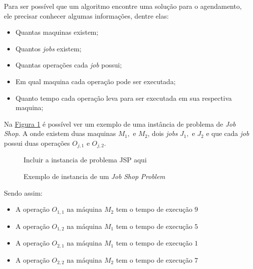             Para ser possível que um algoritmo encontre uma solução para o agendamento, ele precisar conhecer algumas informações, dentre elas: 
            \begin{itemize}
                \item Quantas maquinas existem;
                \item Quantos \textit{jobs} existem;
                \item Quantas operações cada \textit{job} possui;
                \item Em qual maquina cada operação pode ser executada;
                \item Quanto tempo cada operação leva para ser executada em sua respectiva maquina;
            \end{itemize}


            Na 
            \hyperref[fig:ex-instancia-problema-JSP]{Figura \ref{fig:ex-instancia-problema-JSP}}
            é possível ver um exemplo de uma instância de problema de \textit{Job Shop}. 
            A onde existem duas maquinas $M_1, $ e $M_2$, 
            dois \textit{jobs} $J_1, $ e $J_2$ 
            e que cada \textit{job} possui 
            duas operações $O_{j,1} $ e $O_{j,2}$.\\

            \begin{figure}[ht]
                \centering
                \small{Incluir a instancia de problema JSP aqui}
                \caption{Exemplo de instancia de um \textit{Job Shop Problem}}
                \label{fig:ex-instancia-problema-JSP}
            \end{figure}
            
            \noindent Sendo assim:\hfill
            \begin{itemize}
                \item A operação $O_{1,1}$ na máquina $M_2$ tem o tempo de execução $9$
                \item A operação $O_{1,2}$ na máquina $M_1$ tem o tempo de execução $5$
                \item A operação $O_{2,1}$ na máquina $M_1$ tem o tempo de execução $1$
                \item A operação $O_{2,2}$ na máquina $M_2$ tem o tempo de execução $7$
            \end{itemize}
            
